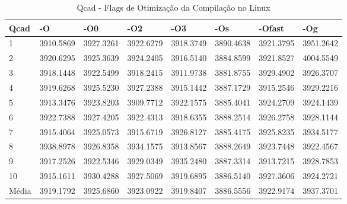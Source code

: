 \begin{table}[!ht]
\centering
\tiny
\caption{Qcad - Flags de Otimização da Compilação no Linux}
\label{tab:otimizacao_compilacao:linux:qcad}
\begin{tabular}{llllllll}
\textbf{Qcad}            & \textbf{-O}  & \textbf{-O0}   & \textbf{-O2} & \textbf{-O3} & \textbf{-Os} & \textbf{-Ofast} & \textbf{-Og} \\ \toprule
1                        & 3910.5869    &  3927.3261     &  3922.6279   &   3918.3749  &   3890.4638  &    3921.3795    &   3951.2642           \\ 
2                        & 3920.6295    &  3925.3639     &  3924.2405   &   3916.5140  &   3884.8599  &    3921.8527    &   4004.5549           \\ 
3                        & 3918.1448    &  3922.5499     &  3918.2415   &   3911.9738  &   3881.8755  &    3929.4902    &   3926.3707           \\ 
4                        & 3919.6268    &  3925.5230     &  3927.2388   &   3915.1442  &   3887.1729  &    3915.2546    &   3929.2216           \\ 
5                        & 3913.3476    &  3923.8203     &  3909.7712   &   3922.1575  &   3885.4041  &    3924.2709    &   3924.1439           \\ 
6                        & 3922.7388    &  3927.4205     &  3922.4313   &   3918.6355  &   3888.2514  &    3926.2758    &   3928.1144           \\ 
7                        & 3915.4064    &  3925.0573     &  3915.6719   &   3926.8127  &   3885.4175  &    3925.8235    &   3934.5177           \\ 
8                        & 3938.8978    &  3926.8358     &  3934.1575   &   3913.8567  &   3888.2649  &    3923.7448    &   3922.4567           \\ 
9                        & 3917.2526    &  3922.5346     &  3929.0349   &   3935.2480  &   3887.3314  &    3913.7215    &   3928.7853           \\ 
10                       & 3915.1611    &  3930.4288     &  3927.5069   &   3919.6895  &   3886.5140  &    3927.3606    &   3924.2721           \\ \bottomrule
Média                    & 3919.1792    &  3925.6860     &  3923.0922   &   3919.8407  &   3886.5556  &    3922.9174    &   3937.3701           \\ 
\end{tabular}
\end{table}

